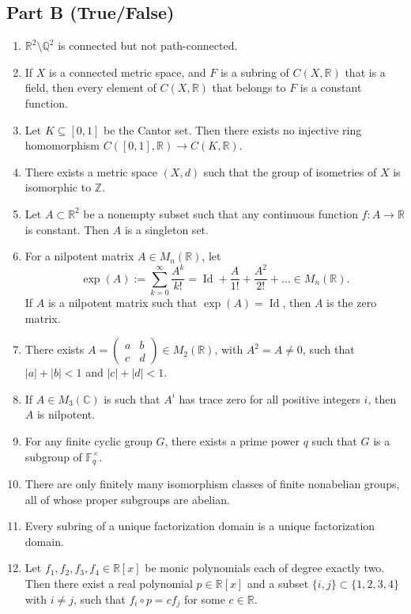 \documentclass[11pt, a4paper]{article}
\begin{document}
\subsection*{Part B (True/False)}
\begin{enumerate}
  \item $\mathbb{R}^2 \setminus \mathbb{Q}^2$ is connected but not path-connected.
  \item If $X$ is a connected metric space, and $F$ is a subring of $C(X, \mathbb{R})$ that is a field, then every element of $C(X, \mathbb{R})$ that belongs to $F$ is a constant function.
  \item Let $K \subseteq [0,1]$ be the Cantor set. Then there exists no injective ring homomorphism $C([0,1], \mathbb{R}) \to C(K, \mathbb{R})$.
  \item There exists a metric space $(X, d)$ such that the group of isometries of $X$ is isomorphic to $\mathbb{Z}$.
  \item Let $A \subset \mathbb{R}^2$ be a nonempty subset such that any continuous function $f: A \to \mathbb{R}$ is constant. Then $A$ is a singleton set.
  \item For a nilpotent matrix $A \in M_n(\mathbb{R})$, let
  \[
    \exp(A) := \sum_{k=0}^\infty \frac{A^k}{k!} = \operatorname{Id} + \frac{A}{1!} + \frac{A^2}{2!} + \dots \in M_n(\mathbb{R}).
  \]
  If $A$ is a nilpotent matrix such that $\exp(A) = \operatorname{Id}$, then $A$ is the zero matrix.
  \item There exists $A = \begin{pmatrix} a & b \\ c & d \end{pmatrix} \in M_2(\mathbb{R})$, with $A^2 = A \ne 0$, such that $|a| + |b| < 1$ and $|c| + |d| < 1$.
  \item If $A \in M_3(\mathbb{C})$ is such that $A^i$ has trace zero for all positive integers $i$, then $A$ is nilpotent.
  \item For any finite cyclic group $G$, there exists a prime power $q$ such that $G$ is a subgroup of $\mathbb{F}_q^\times$.
  \item There are only finitely many isomorphism classes of finite nonabelian groups, all of whose proper subgroups are abelian.
  \item Every subring of a unique factorization domain is a unique factorization domain.
  \item Let $f_1, f_2, f_3, f_4 \in \mathbb{R}[x]$ be monic polynomials each of degree exactly two. Then there exist a real polynomial $p \in \mathbb{R}[x]$ and a subset $\{i, j\} \subset \{1, 2, 3, 4\}$ with $i \ne j$, such that $f_i \circ p = c f_j$ for some $c \in \mathbb{R}$.

\end{enumerate}
\end{document}

